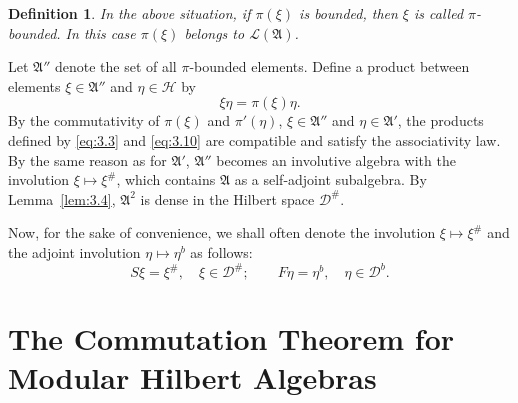 \documentclass[12pt,b5paper,twoside]{article}
\theoremstyle{takesaki}
\newtheorem{definition}{Definition}[section]
\numberwithin{equation}{section}
\begin{document}
\begin{definition}\label{def:3.2}
In the above situation, if $\pi(\xi)$ is bounded, then $\xi$ is called
$\pi$-bounded.  In this case $\pi(\xi)$ belongs to
$\mathcal L(\mathfrak A)$.
\end{definition}

Let $\mathfrak A''$ denote the set of all $\pi$-bounded elements.
Define a product between elements $\xi\in\mathfrak A''$ and
$\eta\in\mathcal H$ by
\begin{equation}
 \xi\eta=\pi(\xi)\eta.
 \tag{3.10}\label{eq:3.10}
\end{equation}
By the commutativity of $\pi(\xi)$ and $\pi'(\eta)$,
$\xi\in\mathfrak A''$ and $\eta\in\mathfrak A'$, the products defined
by \eqref{eq:3.3} and \eqref{eq:3.10} are compatible and satisfy
the associativity law.  By the same reason as for $\mathfrak A'$,
$\mathfrak A''$ becomes an involutive algebra with the involution
$\xi\mapsto\xi^\#$, which contains $\mathfrak A$ as a self-adjoint
subalgebra.  By Lemma~\ref{lem:3.4}, $\mathfrak A^2$ is dense in the
Hilbert space $\mathcal D^\#$.

Now, for the sake of convenience, we shall often denote the involution
$\xi\mapsto\xi^\#$ and the adjoint involution $\eta\mapsto\eta^b$ as
follows:
\[
 S\xi=\xi^\#,\quad \xi\in\mathcal D^\#;
 \qquad
 F\eta=\eta^b,\quad \eta\in\mathcal D^b.
\]

\section{The Commutation Theorem for Modular Hilbert Algebras}
\label{sec:4}
\end{document}
